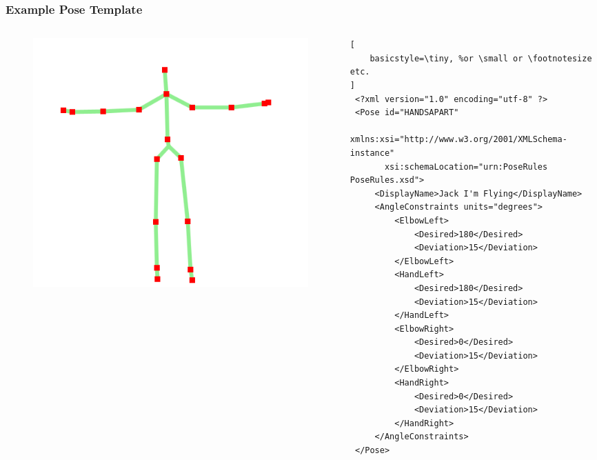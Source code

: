 \begin{frame}[fragile]
\frametitle{Example Pose Template}

\begin{columns}[T]
\begin{column}{.5\linewidth}

\begin{figure}[!ht]
\centering
\includegraphics[width=\linewidth]{figs/hands-apart-pose.png}
\end{figure}

\end{column}

\pause

\begin{column}{.5\linewidth}

\begin{minipage}{\linewidth}

\lstset{
   basicstyle=\ttfamily,
   columns=fullflexible,
   showstringspaces=false%
 }

\begin{lstlisting}[
    basicstyle=\tiny, %or \small or \footnotesize etc.
]
 <?xml version="1.0" encoding="utf-8" ?>
 <Pose id="HANDSAPART"
       xmlns:xsi="http://www.w3.org/2001/XMLSchema-instance"
       xsi:schemaLocation="urn:PoseRules PoseRules.xsd">
     <DisplayName>Jack I'm Flying</DisplayName>
     <AngleConstraints units="degrees">
         <ElbowLeft>
             <Desired>180</Desired>
             <Deviation>15</Deviation>
         </ElbowLeft>
         <HandLeft>
             <Desired>180</Desired>
             <Deviation>15</Deviation>
         </HandLeft>
         <ElbowRight>
             <Desired>0</Desired>
             <Deviation>15</Deviation>
         </ElbowRight>
         <HandRight>
             <Desired>0</Desired>
             <Deviation>15</Deviation>
         </HandRight>
     </AngleConstraints>
 </Pose>
 \end{lstlisting}
\end{minipage}
\end{column}

\end{columns}

\end{frame}
